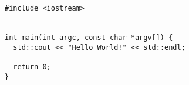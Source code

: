 \begin{verbatim}
#include <iostream>


int main(int argc, const char *argv[]) {
  std::cout << "Hello World!" << std::endl;

  return 0;
}
\end{verbatim}
